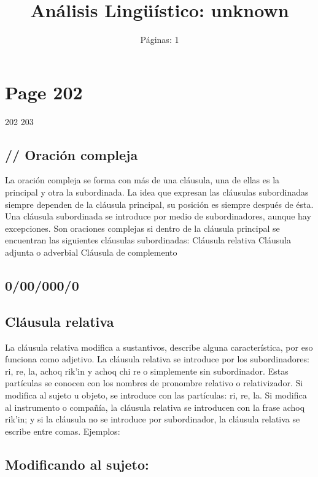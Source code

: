 \documentclass{article}%
\title{Análisis Lingüístico: unknown}%
\author{Páginas: 1}%
\begin{document}
%
\normalsize%
\maketitle%
\section{Page 202}%
\label{sec:Page202}%

%
202 %
203 %
\subsection{// Oración compleja}%
\label{subsec://Oracincompleja}%

%
La oración compleja se forma con más de una cláusula, una de ellas es la principal y %
otra la subordinada. La idea que expresan las cláusulas subordinadas siempre dependen %
de la cláusula principal, su posición es siempre después de ésta. Una cláusula subordinada %
se introduce por medio de subordinadores, aunque hay excepciones. Son oraciones %
complejas si dentro de la cláusula principal se encuentran las siguientes cláusulas %
subordinadas: %
Cláusula relativa %
Cláusula adjunta o adverbial %
Cláusula de complemento %
\subsection{0/00/000/0}%
\label{subsec:0/00/000/0}%

%
\subsection{Cláusula relativa}%
\label{subsec:Clusularelativa}%

%
La cláusula relativa modifica a sustantivos, describe alguna característica, por eso %
funciona como adjetivo. La cláusula relativa se introduce por los subordinadores: ri, %
re, la, achoq rik'in y achoq chi re o simplemente sin subordinador. Estas partículas se %
conocen con los nombres de pronombre relativo o relativizador. Si modifica al sujeto u %
objeto, se introduce con las partículas: ri, re, la. Si modifica al instrumento o compañía, %
la cláusula relativa se introducen con la frase achoq rik'in; y si la cláusula no se %
introduce por subordinador, la cláusula relativa se escribe entre comas. Ejemplos: %
\subsection{Modificando al sujeto:}%
\label{subsec:Modificandoalsujeto}%
\end{document}
